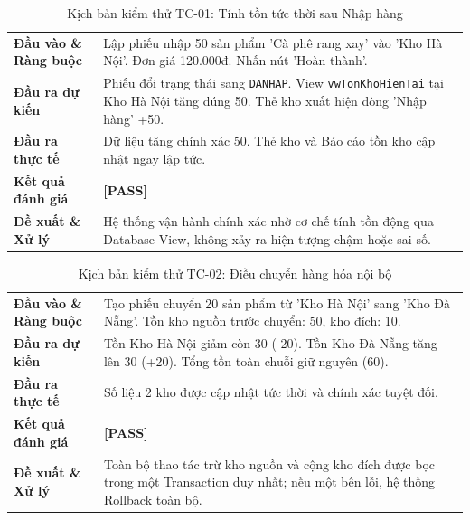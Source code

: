 \documentclass[12pt,a4paper]{report}
\renewcommand{\_}{\textunderscore\allowbreak}
\begin{document}
\begin{table}[H]
\centering
\small
\renewcommand{\arraystretch}{1.25}
\begin{tabularx}{\textwidth}{|p{3.8cm}|Y|}
\hline
{}
 \\
\hline
\textbf{Đầu vào \& Ràng buộc} & Lập phiếu nhập 50 sản phẩm 'Cà phê rang xay' vào 'Kho Hà Nội'. Đơn giá 120.000đ. Nhấn nút 'Hoàn thành'. \\
\hline
\textbf{Đầu ra dự kiến} & Phiếu đổi trạng thái sang \texttt{DA\_NHAP}. View \texttt{vw\_TonKhoHienTai} tại Kho Hà Nội tăng đúng 50. Thẻ kho xuất hiện dòng 'Nhập hàng' +50. \\
\hline
\textbf{Đầu ra thực tế} & Dữ liệu tăng chính xác 50. Thẻ kho và Báo cáo tồn kho cập nhật ngay lập tức. \\
\hline
\textbf{Kết quả đánh giá} & \textbf{[PASS]} \\
\hline
\textbf{Đề xuất \& Xử lý} & Hệ thống vận hành chính xác nhờ cơ chế tính tồn động qua Database View, không xảy ra hiện tượng chậm hoặc sai số. \\
\hline
\end{tabularx}
\caption{Kịch bản kiểm thử TC-01: Tính tồn tức thời sau Nhập hàng}
\label{tab:tc1}
\end{table}

\begin{table}[H]
\centering
\small
\renewcommand{\arraystretch}{1.25}
\begin{tabularx}{\textwidth}{|p{3.8cm}|Y|}
\hline
{}
 \\
\hline
\textbf{Đầu vào \& Ràng buộc} & Tạo phiếu chuyển 20 sản phẩm từ 'Kho Hà Nội' sang 'Kho Đà Nẵng'. Tồn kho nguồn trước chuyển: 50, kho đích: 10. \\
\hline
\textbf{Đầu ra dự kiến} & Tồn Kho Hà Nội giảm còn 30 (-20). Tồn Kho Đà Nẵng tăng lên 30 (+20). Tổng tồn toàn chuỗi giữ nguyên (60). \\
\hline
\textbf{Đầu ra thực tế} & Số liệu 2 kho được cập nhật tức thời và chính xác tuyệt đối. \\
\hline
\textbf{Kết quả đánh giá} & \textbf{[PASS]} \\
\hline
\textbf{Đề xuất \& Xử lý} & Toàn bộ thao tác trừ kho nguồn và cộng kho đích được bọc trong một Transaction duy nhất; nếu một bên lỗi, hệ thống Rollback toàn bộ. \\
\hline
\end{tabularx}
\caption{Kịch bản kiểm thử TC-02: Điều chuyển hàng hóa nội bộ}
\label{tab:tc2}
\end{table}
\end{document}
